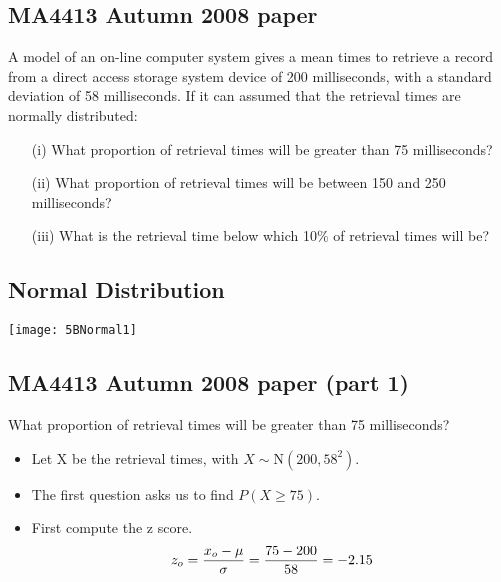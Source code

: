 


{
\subsection*{MA4413 Autumn 2008 paper}
A model of an on-line computer system gives a mean times to retrieve a record from a direct access storage system device of 200 milliseconds, with a standard deviation of 58 milliseconds. If it can assumed that the retrieval times are normally distributed:

\begin{itemize}
\item[(i)] What proportion of retrieval times will be greater than 75 milliseconds?
\item[(ii)] What proportion of retrieval times will be between 150 and 250 milliseconds?
\item[(iii)] What is the retrieval time below which 10\% of retrieval times will be?
\end{itemize}

}

{
\subsection*{Normal Distribution}

\begin{center}
\texttt{[image: 5BNormal1]}
\end{center}


\subsection*{MA4413 Autumn 2008 paper (part 1)}
What proportion of retrieval times will be greater than 75 milliseconds?\\ \bigskip

\begin{itemize}
\item Let X be the retrieval times, with $X \sim \mbox{N}(200,58^2)$.\\
\item The first question asks us to find $P( X \geq 75)$. \\
\item First compute the z score.
\[ z_o =  {x_o - \mu \over \sigma} = {75 - 200 \over 58}  = -2.15 \]
\end{itemize}
}

